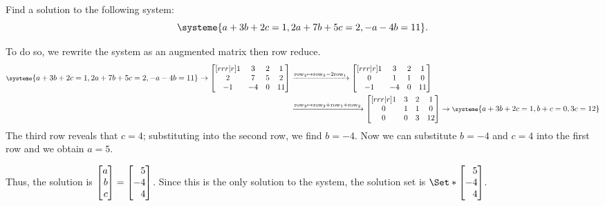	\begin{example}
		Find a solution to the following system:
		\[
			\systeme{
				a+3b+2c=1,
				2a+7b+5c=2,
				-a-4b=11
			}.
		\]

		To do so, we rewrite the system as an augmented matrix then row reduce.
		\begin{align*}
			{\footnotesize
			\systeme{
				a+3b+2c=1,
				2a+7b+5c=2,
				-a-4b=11
			}
			} \rightarrow
			\begin{bmatrix}[rrr|r]
				1&3&2 & 1\\
				2&7&5 & 2\\
				-1&-4&0 & 11
			\end{bmatrix}
			&\xrightarrow{\text{row}_2\mapsto\text{row}_2-2\text{row}_1}
			\begin{bmatrix}[rrr|r]
				1&3&2 & 1\\
				0&1&1 & 0\\
				-1&-4&0 & 11
			\end{bmatrix}\\
			&\xrightarrow{\text{row}_3\mapsto\text{row}_3+\text{row}_1+\text{row}_2}
			\begin{bmatrix}[rrr|r]
				1&3&2 & 1\\
				0&1&1 & 0\\
				0&0&3 & 12
			\end{bmatrix}
			\rightarrow
			{\footnotesize
				\systeme{
				a+3b+2c=1,
				b+c=0,
				3c=12
				}
			}
		\end{align*}
		The third row reveals that $c=4$; substituting into the second row, we find $b=-4$. Now we can substitute $b=-4$ and $c=4$ into the first row and we obtain $a=5$.
		
		Thus, the solution is $\mat{a\\b\\c}=\mat{5\\-4\\4}$. Since this is the only solution to the system, the solution set is $\Set*{\mat{5\\-4\\4}}$.
	\end{example}

